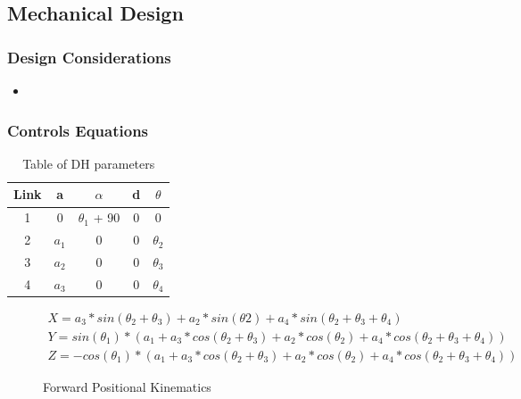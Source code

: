 \subsection{Mechanical Design}
    \subsubsection{Design Considerations}
            \begin{itemize} %
            \item 
            \end{itemize}
     \subsubsection{Controls Equations}
     \begin{table}[H]
        \centering
        \begin{tabular}{|c|c|c|c|c|}
        \hline
            Link & a & $\alpha$ & d & $\theta$ \\
            \hline
            1 & 0 & $\theta_1$ + 90& 0& 0\\
            2 & $a_1$ & 0 & 0 &$\theta_2$ \\
            3 & $a_2$ & 0 & 0 &$\theta_3$ \\
            4 & $a_3$ & 0 & 0 &$\theta_4$ \\
            \hline
            \end{tabular}
        \caption{Table of DH parameters}
        \label{tab:my_label}
    \end{table}
    
    \begin{figure}[H]
    \centering
    \begin{gather*}
    X = a_3*sin(\theta_2+\theta_3)+a_2*sin(\theta2)+a_4*sin(\theta_2+\theta_3+\theta_4)\\
    Y = sin(\theta_1)*(a_1+a_3*cos(\theta_2+\theta_3)+a_2*cos(\theta_2)+a_4*cos(\theta_2+\theta_3+\theta_4))\\
    Z = -cos(\theta_1)*(a_1+a_3*cos(\theta_2+\theta_3)+a_2*cos(\theta_2)+a_4*cos(\theta_2+\theta_3+\theta_4))
    \end{gather*}
    
    \caption{Forward Positional Kinematics}
    \label{fig:my_label}
    \end{figure}
    

